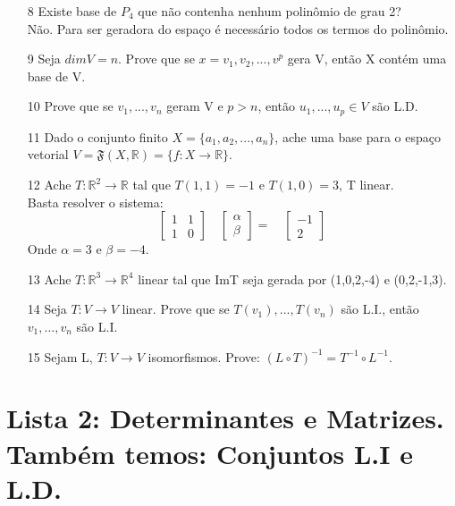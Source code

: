 \documentclass[a4paper]{article}
\begin{document}
\begin{itemize}
\item[8] Existe base de $P_4$ que não contenha nenhum polinômio de grau 2?
\textcolor[rgb]{0,0,1}{\\Não. Para ser geradora do espaço é necessário todos os termos do polinômio.}
\item[9] Seja $dimV=n$. Prove que se $x={v_1,v_2,...,v^p}$ gera V, então X contém uma base de V.

\item[10] Prove que se $v_1,...,v_n$ geram V e $p>n$, então $u_1,...,u_p\in V$ são L.D.

\item[11] Dado o conjunto finito $X=\{a_1,a_2,...,a_n\}$, ache uma base para o espaço vetorial $V=\mathfrak{F}(X,\mathbb{R})=\{f:X\longrightarrow \mathbb{R}\}$.

\item[12] Ache $T:\mathbb{R}^2\longrightarrow \mathbb{R}$ tal que $T(1,1)=-1$ e $T(1,0)=3$, T linear.
\\
\textcolor[rgb]{0,0,1}{
Basta resolver o sistema:
$$
\left[\begin{array}{rr}
1&1\\
1&0
\end{array}\right]
\quad
\left[\begin{array}{c}
\alpha\\
\beta
\end{array}\right]
=
\quad
\left[\begin{array}{c}
-1\\
2
\end{array}\right]
$$
Onde $\alpha=3$  e $\beta=-4$.
}

\item[13] Ache $T:\mathbb{R}^3\longrightarrow \mathbb{R}^4$ linear tal que ImT seja gerada por (1,0,2,-4) e (0,2,-1,3).

\item[14] Seja $T:V\longrightarrow V$ linear. Prove que se $T(v_1),...,T(v_n)$ são L.I., então $v_1,...,v_n$ são L.I.

\item[15] Sejam L, $T:V\longrightarrow V$ isomorfismos. Prove: $(L\circ T)^{-1}=T^{-1}\circ L^{-1}$.
\end{itemize}

\section*{Lista 2: Determinantes e Matrizes. Também temos: Conjuntos L.I e L.D.}
\end{document}
